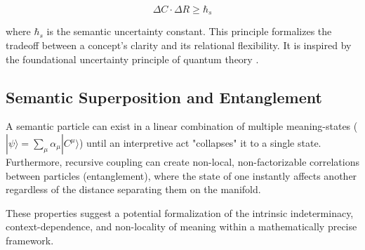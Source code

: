 \begin{equation}
\Delta C \cdot \Delta R \geq \hbar_s
\end{equation}

where \(\hbar_s\) is the semantic uncertainty constant. This principle formalizes the tradeoff between a concept's clarity and its relational flexibility. It is inspired by the foundational uncertainty principle of quantum theory \autocite{Heisenberg1927, WheelerZurek1983}.


\subsection{Semantic Superposition and Entanglement}
\label{13.7.2:semantic_superposition_and_entanglement}

A semantic particle can exist in a linear combination of multiple meaning-states (\(|\psi\rangle = \sum_\mu \alpha_\mu |C^\mu\rangle\)) until an interpretive act "collapses" it to a single state. Furthermore, recursive coupling can create non-local, non-factorizable correlations between particles (entanglement), where the state of one instantly affects another regardless of the distance separating them on the manifold.

These properties suggest a potential formalization of the intrinsic indeterminacy, context-dependence, and non-locality of meaning within a mathematically precise framework. 